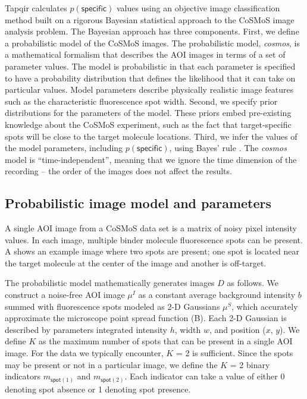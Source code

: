 Tapqir calculates $p(\mathsf{specific})$ values using an objective image classification method built on a rigorous Bayesian statistical approach to the CoSMoS image analysis problem. The Bayesian approach has three components. First, we define a probabilistic model of the CoSMoS images. The probabilistic model, \emph{cosmos}, is a mathematical formalism that describes the AOI images in terms of a set of parameter values.  The model is probabilistic in that each parameter is specified to have a probability distribution that defines the likelihood that it can take on particular values. Model parameters describe physically realistic image features such as the characteristic fluorescence spot width. Second, we specify prior distributions for the parameters of the model. These priors embed pre-existing knowledge about the CoSMoS experiment, such as the fact that target-specific spots will be close to the target molecule locations. Third, we infer the values of the model parameters, including $p(\mathsf{specific})$, using Bayes' rule \citep{Bishop2006-oa,Kinz-Thompson2021-tb}. The \emph{cosmos} model is “time-independent”, meaning that we ignore the time dimension of the recording -- the order of the images does not affect the results. 

\subsection{Probabilistic image model and parameters} %

A single AOI image from a CoSMoS data set is a matrix of noisy pixel intensity values.  In each image, multiple binder molecule fluorescence spots can be present. A shows an example image where two spots are present; one spot is located near the target molecule at the center of the image and another is off-target.

The probabilistic model mathematically generates images $D$ as follows.  We construct a noise-free AOI image $\mu^I$ as a constant average background intensity $b$ summed with fluorescence spots modeled as 2-D Gaussians $\mu^S$, which accurately approximate the microscope point spread function \citep{Zhang2007-rb} (B). Each 2-D Gaussian is described by parameters integrated intensity $h$, width $w$, and position ($x$, $y$). We define $K$ as the maximum number of spots that can be present in a single AOI image.  For the data we typically encounter, $K$ = 2 is sufficient. Since the spots may be present or not in a particular image, we define the $K$ = 2 binary indicators $m_{\mathsf{spot}(1)}$ and $m_{\mathsf{spot}(2)}$.  Each indicator can take a value of either 0 denoting spot absence or 1 denoting spot presence. 

